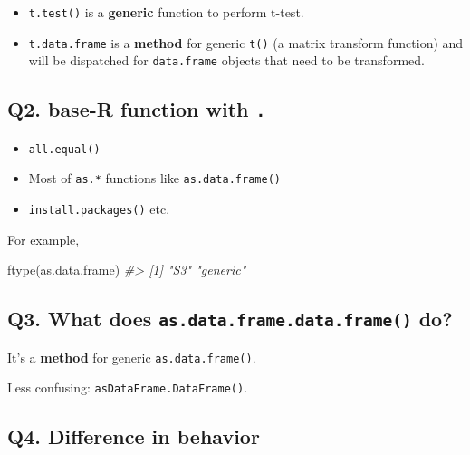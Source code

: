 \documentclass[
]{book}
\newenvironment{Shaded}{\begin{snugshade}}{\end{snugshade}}
\newcommand{\CommentTok}[1]{\textcolor[rgb]{0.56,0.35,0.01}{\textit{#1}}}
\newcommand{\FunctionTok}[1]{\textcolor[rgb]{0.00,0.00,0.00}{#1}}
\newcommand{\NormalTok}[1]{#1}
\providecommand{\tightlist}{%
  \setlength{\itemsep}{0pt}\setlength{\parskip}{0pt}}
\begin{document}
\begin{itemize}
\item
  \texttt{t.test()} is a \textbf{generic} function to perform t-test.
\item
  \texttt{t.data.frame} is a \textbf{method} for generic \texttt{t()} (a matrix transform function) and will be dispatched for \texttt{data.frame} objects that need to be transformed.
\end{itemize}

\hypertarget{q2.-base-r-function-with-.}{%
\subsection*{\texorpdfstring{Q2. base-R function with \texttt{.}}{Q2. base-R function with .}}\label{q2.-base-r-function-with-.}}

\begin{itemize}
\tightlist
\item
  \texttt{all.equal()}
\item
  Most of \texttt{as.*} functions like \texttt{as.data.frame()}
\item
  \texttt{install.packages()}
  etc.
\end{itemize}

For example,

\begin{Shaded}
\begin{Highlighting}[]
\FunctionTok{ftype}\NormalTok{(as.data.frame)}
\CommentTok{\#\textgreater{} [1] "S3"      "generic"}
\end{Highlighting}
\end{Shaded}

\hypertarget{q3.-what-does-as.data.frame.data.frame-do}{%
\subsection*{\texorpdfstring{Q3. What does \texttt{as.data.frame.data.frame()} do?}{Q3. What does as.data.frame.data.frame() do?}}\label{q3.-what-does-as.data.frame.data.frame-do}}

It's a \textbf{method} for generic \texttt{as.data.frame()}.

Less confusing: \texttt{asDataFrame.DataFrame()}.

\hypertarget{q4.-difference-in-behavior}{%
\subsection*{Q4. Difference in behavior}\label{q4.-difference-in-behavior}}
\end{document}
